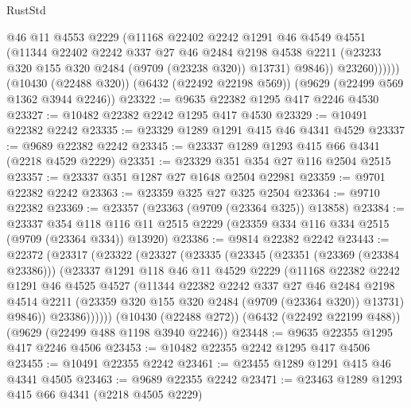 \begin{lexlean}{RustStd}
\begin{coremodule}
                @46
                @11
                @4553
                @2229
                (@11168
                  @22402
                  @2242
                  @1291
                  @46
                  @4549
                  @4551
                  (@11344
                    @22402
                    @2242
                    @337
                    @27
                    @46
                    @2484
                    @2198
                    @4538
                    @2211
                    (@23233 @320 @155 @320 @2484 (@9709 (@23238 @320)) @13731)
                    @9846))
                @23260))))))
    (@10430 (@22488 @320))
    (@6432 (@22492 @22198 @569))
    (@9629 (@22499 @569 @1362 @3944 @2246))
@23322 := @9635 @22382 @1295 @417 @2246 @4530
@23327 := @10482 @22382 @2242 @1295 @417 @4530
@23329 := @10491 @22382 @2242
@23335 := @23329 @1289 @1291 @415 @46 @4341 @4529
@23337 := @9689 @22382 @2242
@23345 := @23337 @1289 @1293 @415 @66 @4341 (@2218 @4529 @2229)
@23351 := @23329 @351 @354 @27 @116 @2504 @2515
@23357 := @23337 @351 @1287 @27 @1648 @2504 @22981
@23359 := @9701 @22382 @2242
@23363 := @23359 @325 @27 @325 @2504
@23364 := @9710 @22382
@23369 := @23357 (@23363 (@9709 (@23364 @325)) @13858)
@23384 := @23337
    @354
    @118
    @116
    @11
    @2515
    @2229
    (@23359 @334 @116 @334 @2515 (@9709 (@23364 @334)) @13920)
@23386 := @9814 @22382 @2242
@23443 := @22372
    (@23317
      (@23322
        (@23327
          (@23335
            (@23345
              (@23351 (@23369 (@23384 @23386)))
              (@23337
                @1291
                @118
                @46
                @11
                @4529
                @2229
                (@11168
                  @22382
                  @2242
                  @1291
                  @46
                  @4525
                  @4527
                  (@11344
                    @22382
                    @2242
                    @337
                    @27
                    @46
                    @2484
                    @2198
                    @4514
                    @2211
                    (@23359 @320 @155 @320 @2484 (@9709 (@23364 @320)) @13731)
                    @9846))
                @23386))))))
    (@10430 (@22488 @272))
    (@6432 (@22492 @22199 @488))
    (@9629 (@22499 @488 @1198 @3940 @2246))
@23448 := @9635 @22355 @1295 @417 @2246 @4506
@23453 := @10482 @22355 @2242 @1295 @417 @4506
@23455 := @10491 @22355 @2242
@23461 := @23455 @1289 @1291 @415 @46 @4341 @4505
@23463 := @9689 @22355 @2242
@23471 := @23463 @1289 @1293 @415 @66 @4341 (@2218 @4505 @2229)

\end{coremodule}
\end{lexlean}
